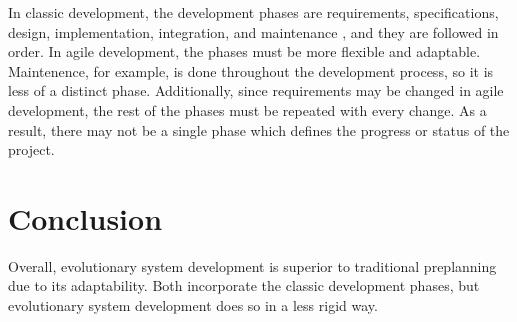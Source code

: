 \documentclass[11pt]{article}
\begin{document}
\begin{doublespace}
In classic development, the development phases are requirements, specifications, design, implementation, integration, and maintenance \cite{beck118}, and they are followed in order. 
In agile development, the phases must be more flexible and adaptable. Maintenence, for example, is 
done throughout the development process, so it is less of a distinct phase. Additionally, since requirements may be changed in agile development,
 the rest of the phases must be repeated with every change. As a result, there may not be a single phase which defines the 
progress or status of the project.  


  \section{Conclusion}

Overall, evolutionary system development is superior to traditional preplanning due to its adaptability. Both incorporate the classic development phases, but evolutionary system development does so in a less rigid way.

\end{doublespace}



\end{document}
